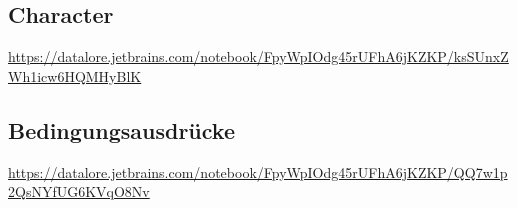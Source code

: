 \documentclass[]{scrartcl}
\begin{document}
\subsection*{Character}
\url{https://datalore.jetbrains.com/notebook/FpyWpIOdg45rUFhA6jKZKP/ksSUnxZWh1icw6HQMHyBlK}
%
\subsection*{Bedingungsausdrücke}
\url{https://datalore.jetbrains.com/notebook/FpyWpIOdg45rUFhA6jKZKP/QQ7w1p2QsNYfUG6KVqO8Nv}
%
%
%
%
%
%
%
%
\end{document}
